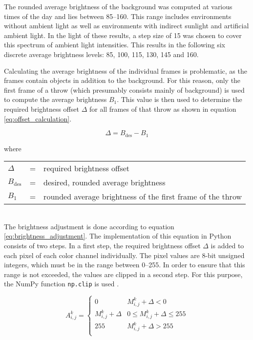 \clearpage

The rounded average brightness of the background was computed at various times of the day and lies between \numrange{85}{160}.
This range includes environments without ambient light as well as environments with indirect sunlight and artificial ambient light.
In the light of these results, a step size of \num{15} was chosen to cover this spectrum of ambient light intensities.
This results in the following six discrete average brightness levels: \num{85}, \num{100}, \num{115}, \num{130}, \num{145} and \num{160}.

Calculating the average brightness of the individual frames is problematic, as the frames contain objects in addition to the background.
For this reason, only the first frame of a throw (which presumably consists mainly of background) is used to compute the average brightness $B_1$.
This value is then used to determine the required brightness offset $\Delta$ for all frames of that throw as shown in equation \ref{eq:offset_calculation}.

\begin{equation}
  \Delta = B_{\text{des}} - B_1
  \label{eq:offset_calculation}
\end{equation}

where

\begin{tabular}{lll}
  $\Delta$ & = & required brightness offset \\
  $B_{\text{des}}$ & = & desired, rounded average brightness \\
  $B_1$ & = & rounded average brightness of the first frame of the throw \\
\end{tabular}
\\

The brightness adjustment is done according to equation \ref{eq:brightness_adjustment}.
The implementation of this equation in Python consists of two steps.
In a first step, the required brightness offset $\Delta$ is added to each pixel of each color channel individually.
The pixel values are 8-bit unsigned integers, which must be in the range between \numrange{0}{255}.
In order to ensure that this range is not exceeded, the values are clipped in a second step.
For this purpose, the NumPy function \texttt{np.clip} is used \cite{training_numpy_clip}.

\begin{equation}
  A_{i,j}^{k} =
  \begin{cases}
    0 & M_{i,j}^{k} + \Delta < 0 \\
    M_{i,j}^{k} + \Delta & 0\leq M_{i,j}^{k} + \Delta\leq 255 \\
    255 & M_{i,j}^{k} + \Delta > 255 \\
  \end{cases}
  \label{eq:brightness_adjustment}
\end{equation}

